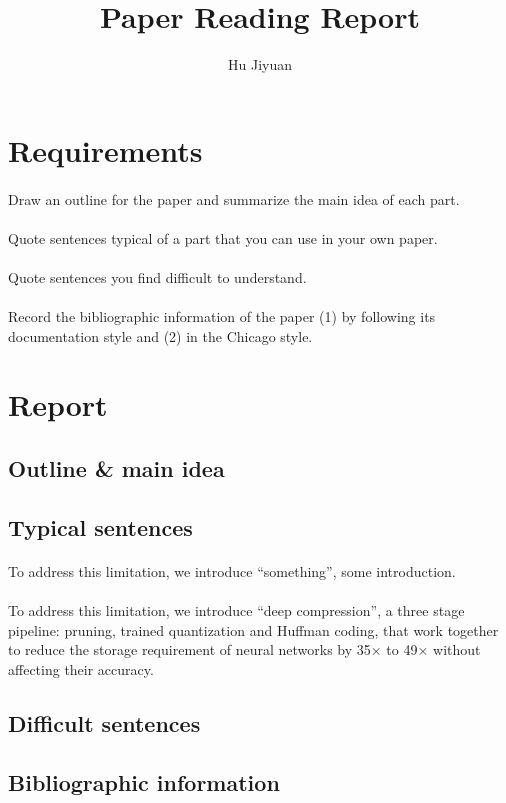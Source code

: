 \documentclass{article}
\author{Hu Jiyuan}
\title{Paper Reading Report}
\begin{document}
\maketitle
\section{Requirements}

\paragraph{} Draw an outline for the paper and summarize the main idea of each part.
\paragraph{} Quote sentences typical of a part that you can use in your own paper.
\paragraph{} Quote sentences you find difficult to understand.
\paragraph{} Record the bibliographic information of the paper 
(1) by following its documentation style and 
(2) in the Chicago style.

\section{Report}
\subsection{Outline \& main idea}
\paragraph{} 
\subsection{Typical sentences}
\paragraph{} To address this limitation, we introduce “something”, some introduction.

\paragraph{} To
address this limitation, we introduce “deep compression”, a three stage pipeline:
pruning, trained quantization and Huffman coding, that work together to reduce
the storage requirement of neural networks by 35× to 49× without affecting their
accuracy.


\subsection{Difficult sentences}
\paragraph{} 
\subsection{Bibliographic information}
\paragraph{} 
\end{document}
